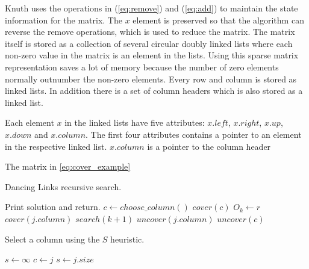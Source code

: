 Knuth uses the operations in (\ref{eq:remove}) and (\ref{eq:add}) to maintain the state information for the matrix.
The $x$ element is preserved so that the algorithm can reverse the remove operations, which is used to reduce the matrix.
The matrix itself is stored as a collection of several circular doubly linked lists where each non-zero value in the matrix is an element in the lists.
Using this sparse matrix representation saves a lot of memory because the number of zero elements normally outnumber the non-zero elements.
Every row and column is stored as linked lists.
In addition there is a set of column headers which is also stored as a linked list.

Each element $x$ in the linked lists have five attributes: $x.left$, $x.right$, $x.up$, $x.down$ and $x.column$.
The first four attributes contains a pointer to an element in the respective linked list.
$x.column$ is a pointer to the column header 

The matrix in \ref{eq:cover_example} 









\begin{algorithm}[H]
	\caption{Dancing Links recursive search.}
	\label{dlx_search}
	\begin{distribalgo}[1]
				\STATE Print solution and return.  
			\ENDIF
			\STATE $c \leftarrow choose\_column()$
			\STATE $cover(c)$
				\STATE $O_k \leftarrow r$
					\STATE $cover(j.column)$
				\ENDFOR
				\STATE $search(k + 1)$
					\STATE $uncover(j.column)$
				\ENDFOR
			\ENDFOR
			\STATE $uncover(c)$
		\ENDPROC
	\end{distribalgo}
\end{algorithm}

\begin{algorithm}[H]
	\caption{Select a column using the $S$ heuristic.}
	\label{dlx_column}
	\begin{distribalgo}[1]
			\STATE $s \leftarrow \infty$
					\STATE $c \leftarrow j$
					\STATE $s \leftarrow j.size$
				\ENDIF
			\ENDFOR
		\ENDFUNC
	\end{distribalgo}
\end{algorithm}

